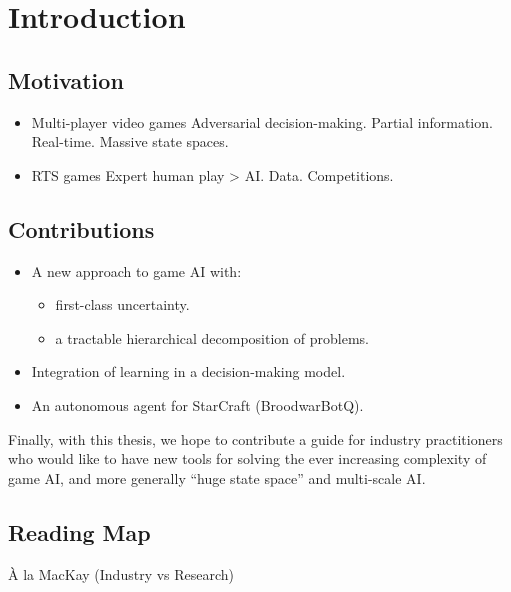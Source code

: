 \chapter{Introduction}

\adjustmtc
\chaptertoc

\section{Motivation}

\begin{itemize}
\item Multi-player video games
Adversarial decision-making. Partial information. Real-time. Massive state spaces.
\item RTS games
Expert human play > AI. Data. Competitions.
\end{itemize}

\section{Contributions}

\begin{itemize}
\item A new approach to game AI with:
\begin{itemize}
\item first-class uncertainty.
\item a tractable hierarchical decomposition of problems.
\end{itemize}
\item Integration of learning in a decision-making model. 
\item An autonomous agent for StarCraft (BroodwarBotQ).
\end{itemize}

Finally, with this thesis, we hope to contribute a guide for industry practitioners who would like to have new tools for solving the ever increasing complexity of game AI, and more generally ``huge state space'' and multi-scale AI.




\section{Reading Map}

À la MacKay (Industry vs Research)


